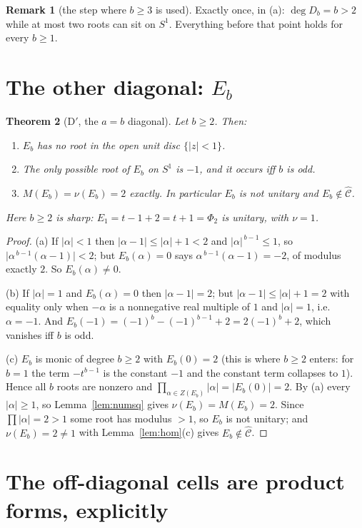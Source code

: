 \documentclass[11pt]{article}
\newtheorem{theorem}{Theorem}[section]
\theoremstyle{definition}
\newtheorem{remark}[theorem]{Remark}
\newcommand{\Chat}{\widehat{\mathcal{C}}}
\newcommand{\Scirc}{S^1}
\begin{document}
\begin{remark}[the step where $b\ge3$ is used]
Exactly once, in (a): $\deg D_b=b>2$ while at most two roots can sit on $\Scirc$. Everything
before that point holds for every $b\ge1$.
\end{remark}

\section{The other diagonal: $E_b$}

\begin{theorem}[D$'$, the $a=b$ diagonal]\label{thm:Eprime}
Let $b\ge2$. Then:
\begin{enumerate}
\item[(a)] $E_b$ has no root in the open unit disc $\{|z|<1\}$.
\item[(b)] The only possible root of $E_b$ on $\Scirc$ is $-1$, and it occurs iff $b$ is odd.
\item[(c)] $M(E_b)=\nu(E_b)=2$ exactly. In particular $E_b$ is not unitary and
      $E_b\notin\Chat$.
\end{enumerate}
Here $b\ge2$ is sharp: $E_1=t-1+2=t+1=\Phi_2$ is unitary, with $\nu=1$.
\end{theorem}

\begin{proof}
(a) If $|\alpha|<1$ then $|\alpha-1|\le|\alpha|+1<2$ and $|\alpha|^{\,b-1}\le1$, so
$\bigl|\alpha^{\,b-1}(\alpha-1)\bigr|<2$; but $E_b(\alpha)=0$ says
$\alpha^{\,b-1}(\alpha-1)=-2$, of modulus exactly $2$. So $E_b(\alpha)\ne0$.

(b) If $|\alpha|=1$ and $E_b(\alpha)=0$ then $|\alpha-1|=2$; but $|\alpha-1|\le|\alpha|+1=2$ with
equality only when $-\alpha$ is a nonnegative real multiple of $1$ and $|\alpha|=1$, i.e.\
$\alpha=-1$. And $E_b(-1)=(-1)^{b}-(-1)^{b-1}+2=2(-1)^{b}+2$, which vanishes iff $b$ is odd.

(c) $E_b$ is monic of degree $b\ge2$ with $E_b(0)=2$ (this is where $b\ge2$ enters: for $b=1$ the
term $-t^{b-1}$ is the constant $-1$ and the constant term collapses to $1$). Hence all $b$ roots
are nonzero and $\prod_{\alpha\in Z(E_b)}|\alpha|=|E_b(0)|=2$. By (a) every $|\alpha|\ge1$, so
Lemma~\ref{lem:numsq} gives $\nu(E_b)=M(E_b)=2$. Since $\prod|\alpha|=2>1$ some root has modulus
$>1$, so $E_b$ is not unitary; and $\nu(E_b)=2\ne1$ with Lemma~\ref{lem:hom}(c) gives
$E_b\notin\Chat$.
\end{proof}

\section{The off-diagonal cells are product forms, explicitly}
\end{document}
